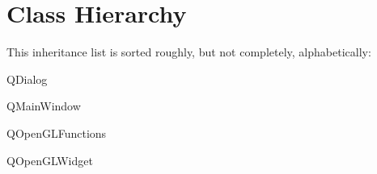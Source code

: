 \section{Class Hierarchy}
This inheritance list is sorted roughly, but not completely, alphabetically\+:\begin{DoxyCompactList}
\item Q\+Dialog\begin{DoxyCompactList}
\item {}
\end{DoxyCompactList}
\item Q\+Main\+Window\begin{DoxyCompactList}
\item {}
\end{DoxyCompactList}
\item Q\+Open\+G\+L\+Functions\begin{DoxyCompactList}
\item {}
\item {}
\end{DoxyCompactList}
\item Q\+Open\+G\+L\+Widget\begin{DoxyCompactList}
\item {}
\end{DoxyCompactList}
\item {}
\item {}
\end{DoxyCompactList}
